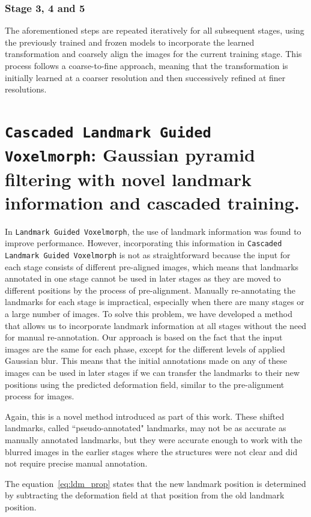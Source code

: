 \documentclass{book}
\begin{document}
	\subsubsection{Stage 3, 4 and 5}
	The aforementioned steps are repeated iteratively for all subsequent stages, using the previously trained and frozen models to incorporate the learned transformation and coarsely align the images for the current training stage. This process follows a coarse-to-fine approach, meaning that the transformation is initially learned at a coarser resolution and then successively refined at finer resolutions.
	
	\section{\texttt{Cascaded Landmark Guided Voxelmorph}: Gaussian pyramid filtering with novel landmark information and cascaded training.}
	In \texttt{Landmark Guided Voxelmorph}, the use of landmark information was found to improve performance. However, incorporating this information in \texttt{Cascaded Landmark Guided Voxelmorph} is not as straightforward because the input for each stage consists of different pre-aligned images, which means that landmarks annotated in one stage cannot be used in later stages as they are moved to different positions by the process of pre-alignment. Manually re-annotating the landmarks for each stage is impractical, especially when there are many stages or a large number of images. To solve this problem, we have developed a method that allows us to incorporate landmark information at all stages without the need for manual re-annotation. Our approach is based on the fact that the input images are the same for each phase, except for the different levels of applied Gaussian blur. This means that the initial annotations made on any of these images can be used in later stages if we can transfer the landmarks to their new positions using the predicted deformation field, similar to the pre-alignment process for images.
	
	Again, this is a novel method introduced as part of this work. These shifted landmarks, called ``pseudo-annotated" landmarks, may not be as accurate as manually annotated landmarks, but they were accurate enough to work with the blurred images in the earlier stages where the structures were not clear and did not require precise manual annotation.
	
	The equation~\ref{eq:ldm_prop} states that the new landmark position is determined by subtracting the deformation field at that position from the old landmark position.
	
\end{document}
